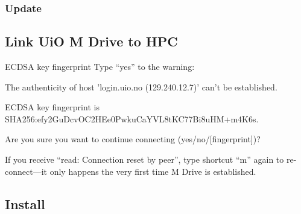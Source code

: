 


\subsubsection{Update \CPy}



\subsection{Link UiO M Drive to HPC}




\begin{note}{ECDSA key fingerprint}
    Type ``yes'' to the warning:

    The authenticity of host 'login.uio.no (129.240.12.7)' can't be established.

    ECDSA key fingerprint is SHA256:efy2GuDcvOC2HEe0PwkuCaYVL8tKC77Bi8uHM+m4K6s.

    Are you sure you want to continue connecting (yes/no/[fingerprint])?

    \bigskip

    If you receive ``read: Connection reset by peer'', type shortcut ``m'' again to re-connect---it only happens the very first time M Drive is established.
\end{note}

\subsection{Install \cM}

